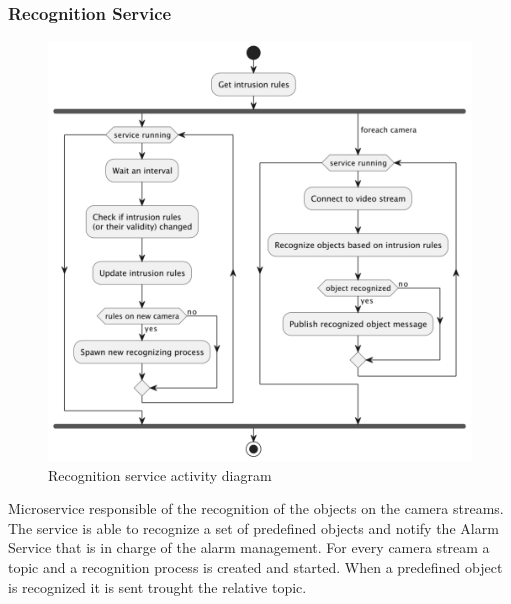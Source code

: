 \documentclass{scrartcl}
\begin{document}
    \subsubsection{Recognition Service}
    \begin{figure}
        \centering
        \includegraphics[scale=0.6]{img/recognition-activity}
        \caption{Recognition service activity diagram}
        \label{fig:recognition-activity}
    \end{figure}
    Microservice responsible of the recognition of the objects on the camera streams. The service is able to recognize a set of predefined objects and notify the Alarm Service that is in charge of the alarm management. For every camera stream a topic and a recognition process is created and started. When a predefined object is recognized it is sent trought the relative topic.
\end{document}
